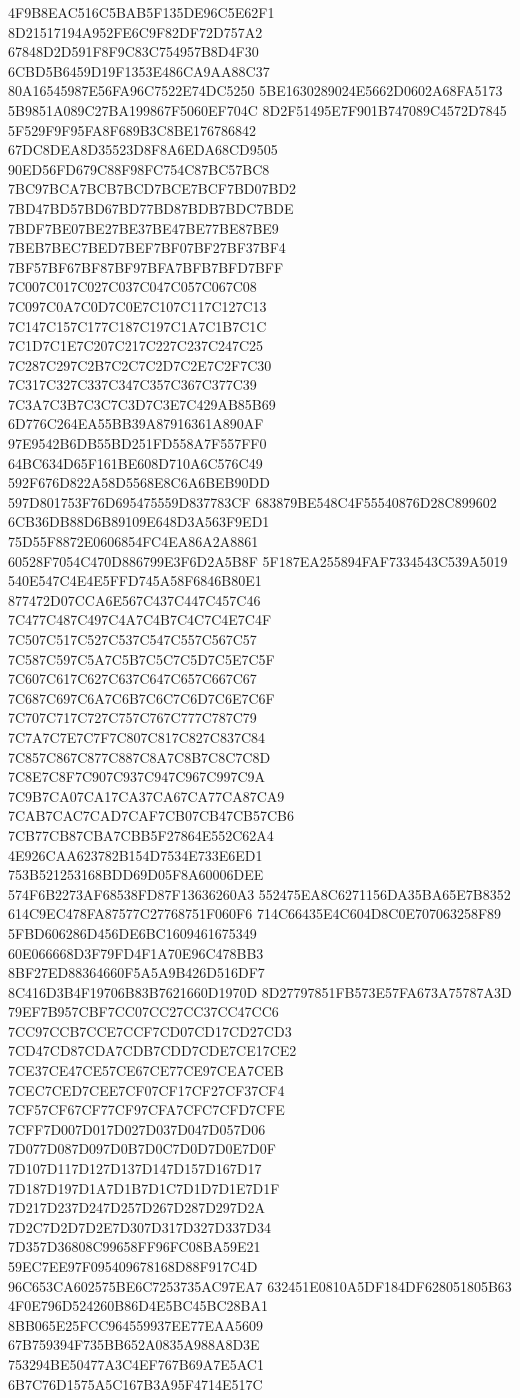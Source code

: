 4F9B8EAC516C5BAB5F135DE96C5E62F1
8D21517194A952FE6C9F82DF72D757A2
67848D2D591F8F9C83C754957B8D4F30
6CBD5B6459D19F1353E486CA9AA88C37
80A16545987E56FA96C7522E74DC5250
5BE1630289024E5662D0602A68FA5173
5B9851A089C27BA199867F5060EF704C
8D2F51495E7F901B747089C4572D7845
5F529F9F95FA8F689B3C8BE176786842
67DC8DEA8D35523D8F8A6EDA68CD9505
90ED56FD679C88F98FC754C87BC57BC8
7BC97BCA7BCB7BCD7BCE7BCF7BD07BD2
7BD47BD57BD67BD77BD87BDB7BDC7BDE
7BDF7BE07BE27BE37BE47BE77BE87BE9
7BEB7BEC7BED7BEF7BF07BF27BF37BF4
7BF57BF67BF87BF97BFA7BFB7BFD7BFF
7C007C017C027C037C047C057C067C08
7C097C0A7C0D7C0E7C107C117C127C13
7C147C157C177C187C197C1A7C1B7C1C
7C1D7C1E7C207C217C227C237C247C25
7C287C297C2B7C2C7C2D7C2E7C2F7C30
7C317C327C337C347C357C367C377C39
7C3A7C3B7C3C7C3D7C3E7C429AB85B69
6D776C264EA55BB39A87916361A890AF
97E9542B6DB55BD251FD558A7F557FF0
64BC634D65F161BE608D710A6C576C49
592F676D822A58D5568E8C6A6BEB90DD
597D801753F76D695475559D837783CF
683879BE548C4F55540876D28C899602
6CB36DB88D6B89109E648D3A563F9ED1
75D55F8872E0606854FC4EA86A2A8861
60528F7054C470D886799E3F6D2A5B8F
5F187EA255894FAF7334543C539A5019
540E547C4E4E5FFD745A58F6846B80E1
877472D07CCA6E567C437C447C457C46
7C477C487C497C4A7C4B7C4C7C4E7C4F
7C507C517C527C537C547C557C567C57
7C587C597C5A7C5B7C5C7C5D7C5E7C5F
7C607C617C627C637C647C657C667C67
7C687C697C6A7C6B7C6C7C6D7C6E7C6F
7C707C717C727C757C767C777C787C79
7C7A7C7E7C7F7C807C817C827C837C84
7C857C867C877C887C8A7C8B7C8C7C8D
7C8E7C8F7C907C937C947C967C997C9A
7C9B7CA07CA17CA37CA67CA77CA87CA9
7CAB7CAC7CAD7CAF7CB07CB47CB57CB6
7CB77CB87CBA7CBB5F27864E552C62A4
4E926CAA623782B154D7534E733E6ED1
753B521253168BDD69D05F8A60006DEE
574F6B2273AF68538FD87F13636260A3
552475EA8C6271156DA35BA65E7B8352
614C9EC478FA87577C27768751F060F6
714C66435E4C604D8C0E707063258F89
5FBD606286D456DE6BC1609461675349
60E066668D3F79FD4F1A70E96C478BB3
8BF27ED88364660F5A5A9B426D516DF7
8C416D3B4F19706B83B7621660D1970D
8D27797851FB573E57FA673A75787A3D
79EF7B957CBF7CC07CC27CC37CC47CC6
7CC97CCB7CCE7CCF7CD07CD17CD27CD3
7CD47CD87CDA7CDB7CDD7CDE7CE17CE2
7CE37CE47CE57CE67CE77CE97CEA7CEB
7CEC7CED7CEE7CF07CF17CF27CF37CF4
7CF57CF67CF77CF97CFA7CFC7CFD7CFE
7CFF7D007D017D027D037D047D057D06
7D077D087D097D0B7D0C7D0D7D0E7D0F
7D107D117D127D137D147D157D167D17
7D187D197D1A7D1B7D1C7D1D7D1E7D1F
7D217D237D247D257D267D287D297D2A
7D2C7D2D7D2E7D307D317D327D337D34
7D357D36808C99658FF96FC08BA59E21
59EC7EE97F095409678168D88F917C4D
96C653CA602575BE6C7253735AC97EA7
632451E0810A5DF184DF628051805B63
4F0E796D524260B86D4E5BC45BC28BA1
8BB065E25FCC964559937EE77EAA5609
67B759394F735BB652A0835A988A8D3E
753294BE50477A3C4EF767B69A7E5AC1
6B7C76D1575A5C167B3A95F4714E517C
